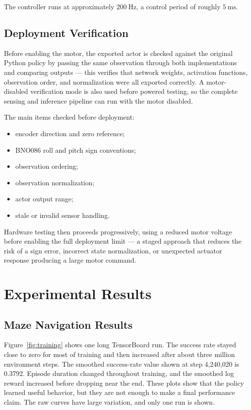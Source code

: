\documentclass[9pt]{extarticle}
\begin{document}
The controller runs at approximately $200~\mathrm{Hz}$, a control period of
roughly $5~\mathrm{ms}$.

\subsection{Deployment Verification}

Before enabling the motor, the exported actor is checked against the
original Python policy by passing the same observation through both
implementations and comparing outputs — this verifies that network
weights, activation functions, observation order, and normalization were
all exported correctly. A motor-disabled verification mode is also used
before powered testing, so the complete sensing and inference pipeline can
run with the motor disabled.

The main items checked before deployment:

\begin{itemize}
    \item encoder direction and zero reference;
    \item BNO086 roll and pitch sign conventions;
    \item observation ordering;
    \item observation normalization;
    \item actor output range;
    \item stale or invalid sensor handling.
\end{itemize}

Hardware testing then proceeds progressively, using a reduced motor voltage
before enabling the full deployment limit — a staged approach that reduces
the risk of a sign error, incorrect state normalization, or unexpected
actuator response producing a large motor command.



\section{Experimental Results}

\subsection{Maze Navigation Results}

Figure~\ref{fig:training} shows one long TensorBoard run. The success rate stayed close to zero for most of training and then increased after about three million environment steps. The smoothed success-rate value shown at step 4,240,020 is 0.3792. Episode duration changed throughout training, and the smoothed log reward increased before dropping near the end. These plots show that the policy learned useful behavior, but they are not enough to make a final performance claim. The raw curves have large variation, and only one run is shown.
\end{document}

